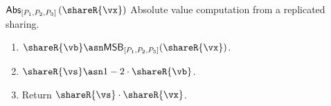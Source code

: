 
\msubsubsection
  {$\mathsf{Abs}_{[P_1, P_2, P_3]} \left( \shareR{\vx} \right)$}
  \label{fig:abs-protocol}
  Absolute value computation from a replicated sharing.
  \begin{enumerate}
    \item $\shareR{\vb} \asn \mathsf{MSB}_{[P_1, P_2, P_3]}(\shareR{\vx})$.
    \item $\shareR{\vs} \asn 1 - 2 \cdot \shareR{\vb}$.
    \item Return $\shareR{\vs} \cdot \shareR{\vx}$.
  \end{enumerate}

